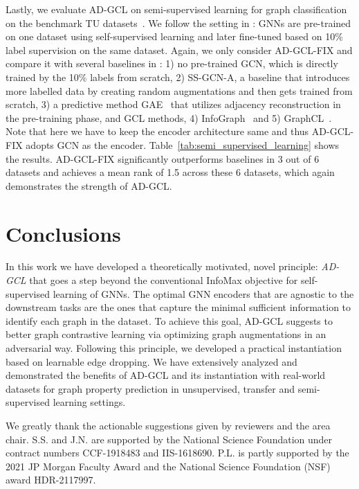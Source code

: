 \begin{table}[t]
\end{table}Lastly, we evaluate AD-GCL on semi-supervised learning for graph classification on the benchmark TU datasets~\cite{Morris+2020}. We follow the setting in \cite{you2020graph}:  GNNs are pre-trained on one dataset using self-supervised learning and later fine-tuned based on 10\% label supervision on the same dataset.  Again, we only consider AD-GCL-FIX and compare it with several baselines in \cite{you2020graph}: 1) no pre-trained GCN, which is directly trained by the 10\% labels from scratch, 2) SS-GCN-A, a baseline that introduces more labelled data by creating random augmentations and then gets trained from scratch, 3) a predictive method GAE~\cite{kipf2016variational} that utilizes adjacency reconstruction in the pre-training phase, and GCL methods, 4) InfoGraph~\cite{sun2019infograph} and 5) GraphCL~\cite{you2020graph}. Note that here we have to keep the encoder architecture same and thus  AD-GCL-FIX adopts GCN as the encoder. Table~\ref{tab:semi_supervised_learning} shows the results. AD-GCL-FIX significantly outperforms baselines in 3 out of 6 datasets and achieves a mean rank of 1.5 across these 6 datasets, which again demonstrates the strength of AD-GCL. \vspace{-3mm}
\section{Conclusions}
\vspace{-2mm}
In this work we have developed a theoretically motivated, novel principle: \textit{AD-GCL} that goes a step beyond the conventional InfoMax objective for self-supervised learning of GNNs. The optimal GNN encoders that are agnostic to the downstream tasks are the ones that capture the minimal sufficient information to identify each graph in the dataset. To achieve this goal, AD-GCL suggests to better graph contrastive learning via optimizing graph augmentations in an adversarial way.  Following this principle, we developed a practical instantiation based on learnable edge dropping. We have extensively analyzed and demonstrated the benefits of AD-GCL and its instantiation with real-world datasets for graph property prediction in unsupervised, transfer and semi-supervised learning settings.

\begin{ack}
We greatly thank the actionable suggestions given by reviewers and the area chair.
S.S. and J.N. are supported by the National Science Foundation under contract numbers CCF-1918483 and IIS-1618690. P.L. is partly supported by the 2021 JP Morgan Faculty Award and the National Science Foundation (NSF) award HDR-2117997.
\end{ack}

\newpage


